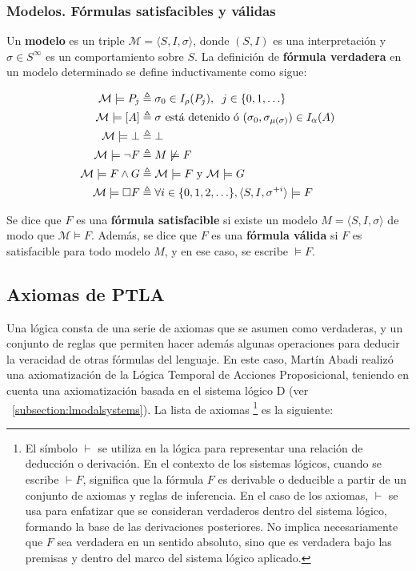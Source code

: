 \subsubsection{Modelos. Fórmulas satisfacibles y válidas}\label{subsubsection:TLAvalidForms}
Un \textbf{modelo} es un triple $\mathcal{M} =  \langle S,I,\sigma \rangle$, donde $(S,I)$ es una interpretación y $\sigma \in S^\infty$ es un comportamiento sobre $S$. La definición de \textbf{fórmula verdadera} en un modelo determinado se define inductivamente como sigue:

\begin{align*}
    \mathcal{M} \models P_j &\triangleq \sigma_0 \in I_\rho(P_j), \hspace{0.2cm} j \in \lbrace 0,1,\ldots \rbrace \\
    \mathcal{M} \models [A] &\triangleq \sigma \text{ está detenido ó } (\sigma_0,\sigma_{\mu(\sigma)}) \in I_\alpha(A) \\
    \mathcal{M} \models \bot &\triangleq \bot \\
    \mathcal{M} \models \neg F &\triangleq M \not \models F \\
    \mathcal{M} \models F \land G &\triangleq \mathcal{M} \models F \text{ y } \mathcal{M} \models G \\
    \mathcal{M} \models \square F &\triangleq \forall i \in \lbrace 0,1,2,\ldots \rbrace, \langle S,I,\sigma^{+i}\rangle \models F
\end{align*}

Se dice que $F$ es una \textbf{fórmula satisfacible} si existe un modelo $M = \langle S,I,\sigma \rangle$ de modo que $\mathcal{M} \models F$. Además, se dice que $F$ es una \textbf{fórmula válida} si $F$ es satisfacible para todo modelo $M$, y en ese caso, se escribe $\models F$.

\subsection{Axiomas de PTLA}\label{subsection:TLAaxioms}
Una lógica consta de una serie de axiomas que se asumen como verdaderas, y un conjunto de reglas que permiten hacer además algunas operaciones para deducir la veracidad de otras fórmulas del lenguaje. En este caso, Martín Abadi realizó una axiomatización de la Lógica Temporal de Acciones Proposicional, teniendo en cuenta una axiomatización basada en el sistema lógico D (ver ~\ref{subsection:lmodalsystems}). La lista de axiomas \footnote{El símbolo $\vdash$ se utiliza en la lógica para representar una relación de deducción o derivación. En el contexto de los sistemas lógicos, cuando se escribe $\vdash F$, significa que la fórmula $F$ es derivable o deducible a partir de un conjunto de axiomas y reglas de inferencia. En el caso de los axiomas, $\vdash$ se usa para enfatizar que se consideran verdaderos dentro del sistema lógico, formando la base de las derivaciones posteriores. No implica necesariamente que $F$ sea verdadera en un sentido absoluto, sino que es verdadera bajo las premisas y dentro del marco del sistema lógico aplicado.} es la siguiente:

